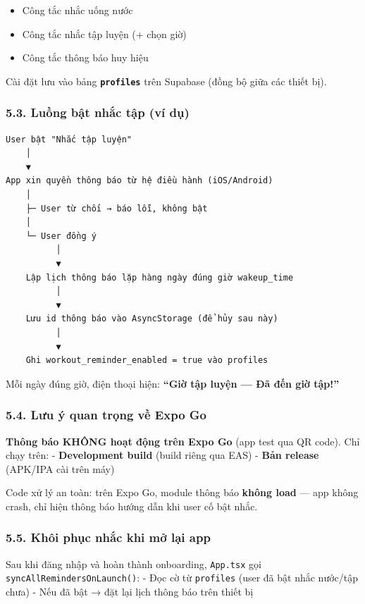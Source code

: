\documentclass[12pt,a4paper]{article}
\providecommand{\tightlist}{%
  \setlength{\itemsep}{0pt}\setlength{\parskip}{0pt}}
\begin{document}
\begin{itemize}
\tightlist
\item
  Công tắc nhắc uống nước
\item
  Công tắc nhắc tập luyện (+ chọn giờ)
\item
  Công tắc thông báo huy hiệu
\end{itemize}

Cài đặt lưu vào bảng \textbf{\texttt{profiles}} trên Supabase (đồng bộ
giữa các thiết bị).

\subsubsection{5.3. Luồng bật nhắc tập (ví
dụ)}\label{luux1ed3ng-bux1eadt-nhux1eafc-tux1eadp-vuxed-dux1ee5}

\begin{verbatim}
User bật "Nhắc tập luyện"
    │
    ▼
App xin quyền thông báo từ hệ điều hành (iOS/Android)
    │
    ├─ User từ chối → báo lỗi, không bật
    │
    └─ User đồng ý
          │
          ▼
    Lập lịch thông báo lặp hàng ngày đúng giờ wakeup_time
          │
          ▼
    Lưu id thông báo vào AsyncStorage (để hủy sau này)
          │
          ▼
    Ghi workout_reminder_enabled = true vào profiles
\end{verbatim}

Mỗi ngày đúng giờ, điện thoại hiện: \textbf{``Giờ tập luyện --- Đã đến
giờ tập!''}

\subsubsection{5.4. Lưu ý quan trọng về Expo
Go}\label{lux1b0u-uxfd-quan-trux1ecdng-vux1ec1-expo-go}

\textbf{Thông báo KHÔNG hoạt động trên Expo Go} (app test qua QR code).
Chỉ chạy trên: - \textbf{Development build} (build riêng qua EAS) -
\textbf{Bản release} (APK/IPA cài trên máy)

Code xử lý an toàn: trên Expo Go, module thông báo \textbf{không load}
--- app không crash, chỉ hiện thông báo hướng dẫn khi user cố bật nhắc.

\subsubsection{5.5. Khôi phục nhắc khi mở lại
app}\label{khuxf4i-phux1ee5c-nhux1eafc-khi-mux1edf-lux1ea1i-app}

Sau khi đăng nhập và hoàn thành onboarding, \texttt{App.tsx} gọi
\texttt{syncAllRemindersOnLaunch()}: - Đọc cờ từ \texttt{profiles} (user
đã bật nhắc nước/tập chưa) - Nếu đã bật → đặt lại lịch thông báo trên
thiết bị
\end{document}
